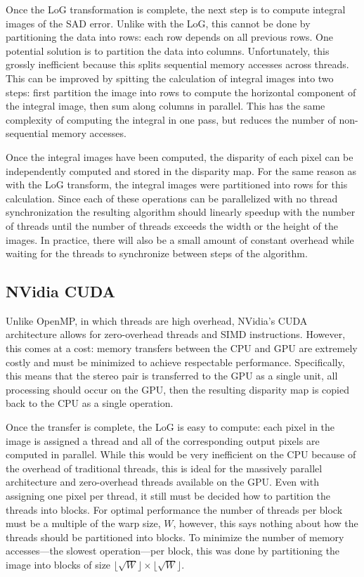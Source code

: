 \documentclass{article}
\newcommand{\floor}[1]{\lfloor #1 \rfloor}
\begin{document}
Once the LoG transformation is complete, the next step is to compute integral
images of the SAD error. Unlike with the LoG, this cannot be done by
partitioning the data into rows: each row depends on all previous rows. One
potential solution is to partition the data into columns. Unfortunately, this
grossly inefficient because this splits sequential memory accesses across
threads. This can be improved by spitting the calculation of integral images
into two steps: first partition the image into rows to compute the horizontal
component of the integral image, then sum along columns in parallel. This has
the same complexity of computing the integral in one pass, but reduces the
number of non-sequential memory accesses.

Once the integral images have been computed, the disparity of each pixel can be
independently computed and stored in the disparity map. For the same reason as
with the LoG transform, the integral images were partitioned into rows for this
calculation. Since each of these operations can be parallelized with no thread
synchronization the resulting algorithm should linearly speedup with the number
of threads until the number of threads exceeds the width or the height of the
images. In practice, there will also be a small amount of constant overhead 
while waiting for the threads to synchronize between steps of the algorithm.

\subsection{NVidia CUDA}
\label{sec:parallel-cuda}
Unlike OpenMP, in which threads are high overhead, NVidia's CUDA architecture
allows for zero-overhead threads and SIMD instructions. However, this comes at
a cost: memory transfers between the CPU and GPU are extremely costly and must
be minimized to achieve respectable performance. Specifically, this means that
the stereo pair is transferred to the GPU as a single unit, all processing
should occur on the GPU, then the resulting disparity map is copied back to the
CPU as a single operation.

Once the transfer is complete, the LoG is easy to compute: each pixel in the
image is assigned a thread and all of the corresponding output pixels are
computed in parallel. While this would be very inefficient on the CPU because
of the overhead of traditional threads, this is ideal for the massively
parallel architecture and zero-overhead threads available on the GPU. Even
with assigning one pixel per thread, it still must be decided how to partition
the threads into blocks. For optimal performance the number of threads per block
must be a multiple of the warp size, $W$, however, this says nothing about how the
threads should be partitioned into blocks. To minimize the number of memory
accesses---the slowest operation---per block, this was done by partitioning the
image into blocks of size $\floor{\sqrt{W}} \times \floor{\sqrt{W}}$.
\end{document}
